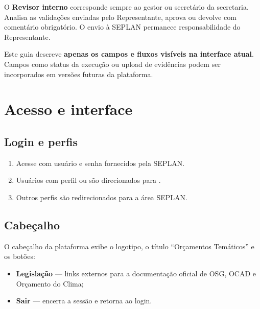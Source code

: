 \documentclass[11pt,a4paper]{article}
\begin{document}
\begin{boxrevisor}
O \textbf{Revisor interno} corresponde sempre ao gestor ou secretário da secretaria. Analisa as validações enviadas pelo Representante, aprova ou devolve com comentário obrigatório. O envio à SEPLAN permanece responsabilidade do Representante.
\end{boxrevisor}

\begin{boxatencao}
Este guia descreve \textbf{apenas os campos e fluxos visíveis na interface atual}. Campos como status da execução ou upload de evidências podem ser incorporados em versões futuras da plataforma.
\end{boxatencao}

\section{Acesso e interface}

\subsection{Login e perfis}

\begin{enumerate}
  \item Acesse  com usuário e senha fornecidos pela SEPLAN.
  \item Usuários com perfil  ou  são direcionados para .
  \item Outros perfis são redirecionados para a área SEPLAN.
\end{enumerate}

\subsection{Cabeçalho}

O cabeçalho da plataforma exibe o logotipo, o título ``Orçamentos Temáticos'' e os botões:

\begin{itemize}
  \item \textbf{Legislação} — links externos para a documentação oficial de OSG, OCAD e Orçamento do Clima;
  \item \textbf{Sair} — encerra a sessão e retorna ao login.
\end{itemize}
\end{document}

